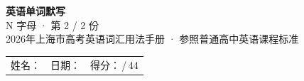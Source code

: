 \documentclass[10pt,a4paper]{article}
\begin{document}
\pagestyle{plain}

\begin{center}
{\LARGE\bfseries 英语单词默写}\\[0.22em]
{\large N 字母 · 第 2 / 2 份}\\[0.18em]
{\small 2026年上海市高考英语词汇用法手册 · 参照普通高中英语课程标准}
\end{center}

\vspace{0.25em}
\noindent\begin{tabular}{@{}p{}@{}p{}@{}p{}@{}}
姓名：\underline{\hspace{2.0cm}} & 日期：\underline{\hspace{2.0cm}} & 得分：\underline{\hspace{1.3cm}}\,/\,44 \\
\end{tabular}

\vspace{0.3em}

\vspace{0.08em}
\end{document}
